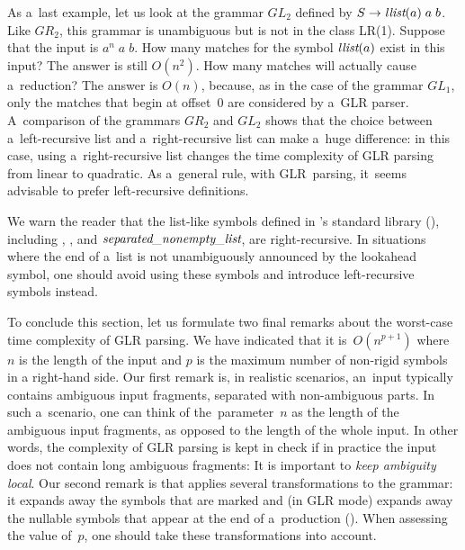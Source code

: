 As a~last example,
let us look at the grammar $\mathit{GL}_2$
defined by $S \rightarrow \textit{llist}(a) \; a \; b$.
%
Like $\mathit{GR}_2$,
this grammar is unambiguous
but is not in the class LR(1).
%
Suppose that the input is $a^n \; a \; b$.
How many matches for the symbol $\textit{llist}(a)$ exist in this input?
The answer is still $O(n^2)$.
How many matches will actually cause a~reduction?
The answer is $O(n)$,
because,
as in the case of the grammar $\mathit{GL}_1$,
only the matches that begin at offset~$0$
are considered by a~GLR parser.
%
A~comparison of the grammars $\mathit{GR}_2$ and $\mathit{GL}_2$
shows that the choice between a~left-recursive list
and a~right-recursive list can make a~huge difference:
in this case, using a~right-recursive list
changes the time complexity of GLR parsing from linear to quadratic.
%
As a~general rule,
with GLR~parsing,
it~seems advisable to prefer left-recursive definitions.

We warn the reader that the list-like symbols
defined in \menhir's standard library (),
including , , and $\textit{separated\_nonempty\_list}$,
are right-recursive.
%
In situations where the end of a~list is not unambiguously announced
by the lookahead symbol, one should avoid using these symbols
and introduce left-recursive symbols instead.
%

To conclude this section,
let us formulate two final remarks
about the worst-case time complexity of GLR parsing.
%
We have indicated that it is~$O(n^{p+1})$
where $n$ is the length of the input
and $p$ is the maximum number of non-rigid symbols in a right-hand side.
%
Our first remark is,
in realistic scenarios,
an~input typically contains ambiguous input fragments,
separated with non-ambiguous parts.
%
In such a~scenario,
one can think of the~parameter~$n$
as the length of the ambiguous input fragments,
as opposed to the length of the whole input.
%
In other words, the complexity of GLR parsing
is kept in check %
if in practice the input does not contain long ambiguous fragments:
%
It is important to \emph{keep ambiguity local}.
%
Our second remark
is that \menhir applies several transformations
to the grammar:
it expands away
the symbols that are marked \dinline
and (in GLR mode)
expands away
the nullable symbols
that appear at the end of a~production ().
%
When assessing the value of~$p$,
one should take these transformations into account.


